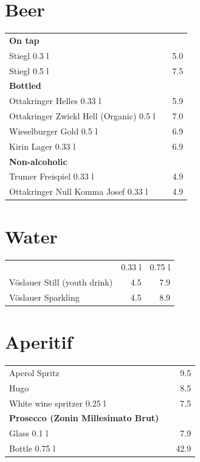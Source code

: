 \documentclass[a4paper,12pt]{article}
\begin{document}
\begin{multicols}{2}
\section*{Beer}
\begin{tabular}{Lrr}
\textbf{On tap}\\
\hspace{0.4cm}Stiegl 0.3 l & & 5.0\\
\hspace{0.4cm}Stiegl 0.5 l & & 7.5\vspace{0.1cm}\\
\textbf{Bottled}\\
\hspace{0.4cm}Ottakringer Helles 0.33 l & & 5.9\\
\hspace{0.4cm}Ottakringer Zwickl Hell (Organic) 0.5 l & & 7.0\\
\hspace{0.4cm}Wieselburger Gold 0.5 l & & 6.9\\
\hspace{0.4cm}Kirin Lager 0.33 l & & 6.9\vspace{0.1cm}\\
\textbf{Non-alcoholic}\\
\hspace{0.4cm}Trumer Freispiel 0.33 l & & 4.9\\
\hspace{0.4cm}Ottakringer Null Komma Josef 0.33 l & & 4.9
\end{tabular}

\columnbreak
\section*{Water}
\begin{tabular}{Lrr}
& 0.33 l & 0.75 l\\
Vöslauer Still (youth drink) & 4.5 & 7.9\\
Vöslauer Sparkling & 4.5 & 8.9
\end{tabular}

\section*{Aperitif}
\begin{tabular}{Lrr}
Aperol Spritz & & 9.5\\
Hugo & & 8.5\\
White wine spritzer 0.25 l & & 7.5\\
\textbf{Prosecco (Zonin Millesimato Brut)}\\
\hspace{0.4cm}Glass 0.1 l & & 7.9\\
\hspace{0.4cm}Bottle 0.75 l & & 42.9
\end{tabular}


\end{multicols}
\end{document}
